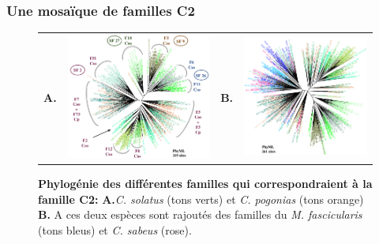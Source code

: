 \documentclass[12pt,a4paper]{article}
\begin{document}
	\subsubsection{Une mosaïque de familles C2}
			\begin{figure}
			\center	
			\begin{tabular}{cccc}
		\textbf{A.} & \includegraphics[scale=0.30]{img/tree_C2_pogonias_solatus.png} & \textbf{B.} & \includegraphics[scale=0.30]{img/tree_C2_all_species.png} \\
	\end{tabular}
	\caption{\textbf{Phylogénie des différentes familles qui correspondraient à la famille C2:}
	\textbf{A.}\textit{C. solatus} (tons verts) et \textit{C. pogonias} (tons orange) \textbf{B.} A ces deux espèces sont rajoutés des familles du \textit{M. fascicularis} (tons bleus) et \textit{C. sabeus} (rose).	 
	\label{tree_C2}
		} 
\end{figure}
\end{document}
